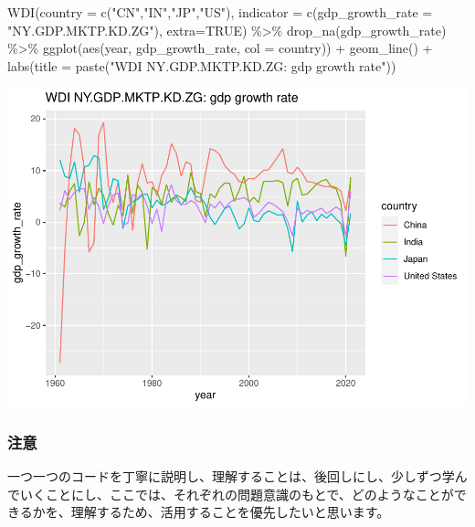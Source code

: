 \documentclass[
]{article}
\newenvironment{Shaded}{\begin{snugshade}}{\end{snugshade}}
\newcommand{\AttributeTok}[1]{\textcolor[rgb]{0.77,0.63,0.00}{#1}}
\newcommand{\ConstantTok}[1]{\textcolor[rgb]{0.00,0.00,0.00}{#1}}
\newcommand{\FunctionTok}[1]{\textcolor[rgb]{0.00,0.00,0.00}{#1}}
\newcommand{\NormalTok}[1]{#1}
\newcommand{\SpecialCharTok}[1]{\textcolor[rgb]{0.00,0.00,0.00}{#1}}
\newcommand{\StringTok}[1]{\textcolor[rgb]{0.31,0.60,0.02}{#1}}
\begin{document}
\begin{Shaded}
\begin{Highlighting}[]
\FunctionTok{WDI}\NormalTok{(}\AttributeTok{country =} \FunctionTok{c}\NormalTok{(}\StringTok{"CN"}\NormalTok{,}\StringTok{"IN"}\NormalTok{,}\StringTok{"JP"}\NormalTok{,}\StringTok{"US"}\NormalTok{), }
    \AttributeTok{indicator =} \FunctionTok{c}\NormalTok{(}\AttributeTok{gdp\_growth\_rate =} \StringTok{"NY.GDP.MKTP.KD.ZG"}\NormalTok{), }\AttributeTok{extra=}\ConstantTok{TRUE}\NormalTok{) }\SpecialCharTok{\%\textgreater{}\%}
  \FunctionTok{drop\_na}\NormalTok{(gdp\_growth\_rate) }\SpecialCharTok{\%\textgreater{}\%} 
  \FunctionTok{ggplot}\NormalTok{(}\FunctionTok{aes}\NormalTok{(year, gdp\_growth\_rate, }\AttributeTok{col =}\NormalTok{ country)) }\SpecialCharTok{+} \FunctionTok{geom\_line}\NormalTok{() }\SpecialCharTok{+}
  \FunctionTok{labs}\NormalTok{(}\AttributeTok{title =} \FunctionTok{paste}\NormalTok{(}\StringTok{"WDI NY.GDP.MKTP.KD.ZG: gdp growth rate"}\NormalTok{))}
\end{Highlighting}
\end{Shaded}

\includegraphics{intro2rj-short_files/figure-latex/unnamed-chunk-14-1.pdf}

\hypertarget{ux6ce8ux610f-1}{%
\subsubsection{注意}\label{ux6ce8ux610f-1}}

一つ一つのコードを丁寧に説明し、理解することは、後回しにし、少しずつ学んでいくことにし、ここでは、それぞれの問題意識のもとで、どのようなことができるかを、理解するため、活用することを優先したいと思います。
\end{document}
